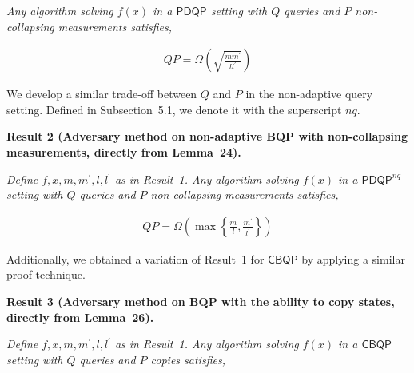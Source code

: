 \emph{Any algorithm solving $f(x)$ in a $\mathsf{PDQP}$ setting with $Q$ queries and $P$ non-collapsing measurements satisfies,}\par


\[\begin{gathered}
\displaystyle QP=\Omega\left(\sqrt{\frac{mm^{\prime}}{ll^{\prime}}}\right)
\end{gathered}\]






We develop a similar trade-off between $Q$ and $P$ in the non-adaptive query setting. Defined in Subsection 5.1, we denote it with the superscript $nq$.\par





\par\medskip\noindent\textbf{
\textbf{Result 2}\textbf{ }(\textbf{Adversary method on non-adaptive BQP with non-collapsing measurements}, directly from Lemma 24)\textbf{.}
}\par



\emph{Define $f,x,m,m^{\prime},l,l^{\prime}$ as in Result 1. Any algorithm solving $f(x)$ in a $\mathsf{PDQP}^{nq}$ setting with $Q$ queries and $P$ non-collapsing measurements satisfies,}\par


\[\begin{gathered}
\displaystyle QP=\Omega\left(\max\left\{\frac{m}{l},\frac{m^{\prime}}{l^{\prime}}\right\}\right)
\end{gathered}\]






Additionally, we obtained a variation of Result 1 for $\mathsf{CBQP}$ by applying a similar proof technique.\par





\par\medskip\noindent\textbf{
\textbf{Result 3}\textbf{ }(\textbf{Adversary method on BQP with the ability to copy states}, directly from Lemma 26)\textbf{.}
}\par



\emph{Define $f,x,m,m^{\prime},l,l^{\prime}$ as in Result 1. Any algorithm solving $f(x)$ in a $\mathsf{CBQP}$ setting with $Q$ queries and $P$ copies satisfies,}\par


